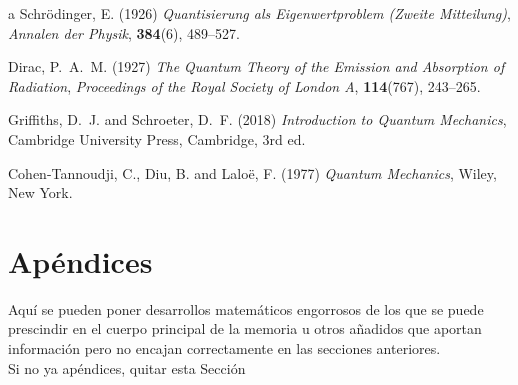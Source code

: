 \documentclass[11pt,a4paper,spanish]{book}
\begin{document}
\begin{thebibliography}{a}
Schr\"odinger, E. (1926)
\emph{Quantisierung als Eigenwertproblem (Zweite Mitteilung)},
\textit{Annalen der Physik}, \textbf{384}(6), 489--527.

Dirac, P.~A.~M. (1927)
\emph{The Quantum Theory of the Emission and Absorption of Radiation},
\textit{Proceedings of the Royal Society of London A}, \textbf{114}(767), 243--265.

Griffiths, D.~J. and Schroeter, D.~F. (2018)
\emph{Introduction to Quantum Mechanics},
Cambridge University Press, Cambridge, 3rd ed.

Cohen-Tannoudji, C., Diu, B. and Laloë, F. (1977)
\emph{Quantum Mechanics},
Wiley, New York.
\end{thebibliography}
% 
%


\appendix
\chapter{Apéndices}

Aquí se pueden poner desarrollos matemáticos engorrosos de los que se puede prescindir en el cuerpo principal de la memoria u otros añadidos que aportan información pero no encajan correctamente en las secciones anteriores.\\

Si no ya apéndices, quitar esta Sección
\end{document}
